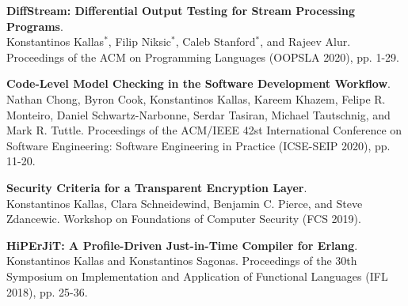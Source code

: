 \begin{minipage}{\textwidth}
\textbf{DiffStream: Differential Output Testing for Stream Processing Programs}. \\
Konstantinos Kallas$^*$, Filip Niksic$^*$, Caleb Stanford$^*$, and Rajeev Alur.
Proceedings of the ACM on Programming Languages (OOPSLA 2020), pp. 1-29. \\
\end{minipage}

\begin{minipage}{\textwidth}
\textbf{Code-Level Model Checking in the Software Development Workflow}. \\
Nathan Chong, Byron Cook, Konstantinos Kallas, Kareem Khazem, Felipe R. Monteiro, Daniel Schwartz-Narbonne, Serdar Tasiran, Michael Tautschnig, and Mark R. Tuttle.
Proceedings of the ACM/IEEE 42st International Conference on Software Engineering: Software Engineering in Practice (ICSE-SEIP 2020), pp. 11-20. \\
\end{minipage}

\begin{minipage}{\textwidth}
\textbf{Security Criteria for a Transparent Encryption Layer}. \\
Konstantinos Kallas, Clara Schneidewind, Benjamin C. Pierce, and Steve Zdancewic.
Workshop on Foundations of Computer Security (FCS 2019). \\
\end{minipage}

\begin{minipage}{\textwidth}
\textbf{HiPErJiT: A Profile-Driven Just-in-Time Compiler for Erlang}. \\
Konstantinos Kallas and Konstantinos Sagonas.
Proceedings of the 30th Symposium on Implementation and Application of Functional Languages (IFL 2018), pp. 25-36. \\
\end{minipage}


